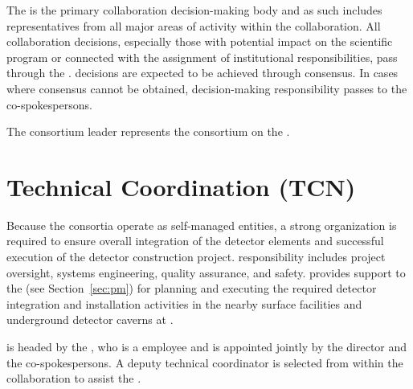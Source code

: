 
The   is the primary
collaboration decision-making body and as such includes
representatives from all major areas of activity within the
collaboration.  All collaboration decisions, especially those with
potential impact on the  scientific program or connected with the
assignment of institutional responsibilities, pass through the
.   decisions are expected to be
achieved through consensus.  In cases where consensus cannot be
obtained, decision-making responsibility passes to the
co-spokespersons.

The consortium leader represents the consortium on the .


\section{Technical Coordination (TCN)}
\label{sec:tc}

Because the consortia operate as self-managed entities, a strong
 organization is required to ensure 
overall integration of the detector elements and successful
execution of the detector construction project.  
responsibility includes project oversight,
systems engineering, quality assurance, and safety.  
provides support to the  (see
Section~\ref{sec:pm}) for planning and executing the required detector
integration and installation activities in the nearby surface
facilities and underground detector caverns at \surf.



 is headed by the , who is a
 employee and is appointed jointly by the   director and
the  co-spokespersons.  A deputy technical coordinator is
selected from within the collaboration to assist the . %

